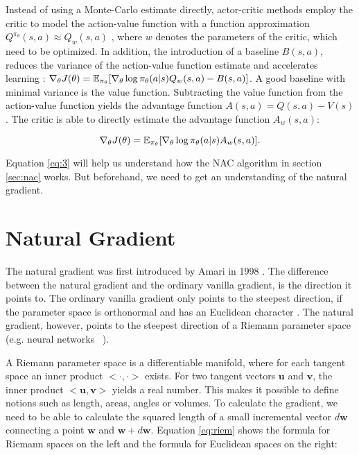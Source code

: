 Instead of using a Monte-Carlo estimate directly, actor-critic methods employ the critic to model the action-value function with a function approximation $Q^{\pi_\theta}(s, a) \approx Q_w(s,a)$ \citep{sutton2000policy}, where $w$ denotes the parameters of the critic, which need to be optimized. In addition, the introduction of a baseline $B(s,a)$, reduces the variance of the action-value function estimate and accelerates learning \citep{sutton2018reinforcement}: \(
\nabla_{\theta}J(\theta)=\operatorname{\mathbb{E}}_{\pi_{\theta}}[\nabla_{\theta}\log\pi_{\theta}(a|s) Q_w(s, a) - B(s,a)]\). A good baseline with minimal variance is the value function. Subtracting the value function from the action-value function yields the advantage function $A(s,a) = Q(s,a)-V(s)$. The critic is able to directly estimate the advantage function $A_w(s,a)$:

\begin{equation}
	\label{eq:3}
	\nabla_{\theta}J(\theta)=\operatorname{\mathbb{E}}_{\pi_{\theta}}[\nabla_{\theta}\log\pi_{\theta}(a|s) A_w(s, a)].
\end{equation}

\noindent Equation \ref{eq:3} will help us understand how the NAC algorithm in section \ref{sec:nac} works. But beforehand, we need to get an understanding of the natural gradient.

\section{Natural Gradient}
\label{sec:NG}

The natural gradient was first introduced by Amari in 1998 \cite{amari1998natural}. The difference between the natural gradient and the ordinary vanilla gradient, is the direction it points to. The ordinary vanilla gradient only points to the steepest direction, if the parameter space is orthonormal and has an Euclidean character \citep{amari1987differential}. The natural gradient, however, points to the steepest direction of a Riemann parameter space (e.g. neural networks  \citep{amari1998natural}).

A Riemann parameter space is a differentiable manifold, where for each tangent space an inner product $<\cdot , \cdot >$ exists. For two tangent vectors $\mathbf{u}$ and $\mathbf{v}$, the inner product $<\mathbf{u}, \mathbf{v}>$ yields a real number. This makes it possible to define notions such as length, areas, angles or volumes. To calculate the gradient, we need to be able to calculate the squared length of a small incremental vector $d\textbf{w}$ connecting a point $\textbf{w}$ and $\textbf{w} + d\textbf{w}$. Equation \ref{eq:riem} shows the formula for Riemann spaces on the left and the formula for Euclidean spaces on the right:


